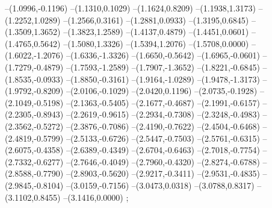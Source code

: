 {--(1.0996,-0.1196)
--(1.1310,0.1029)
--(1.1624,0.8209)
--(1.1938,1.3173)
--(1.2252,1.0289)
--(1.2566,0.3161)
--(1.2881,0.0933)
--(1.3195,0.6845)
--(1.3509,1.3652)
--(1.3823,1.2589)
--(1.4137,0.4879)
--(1.4451,0.0601)
--(1.4765,0.5642)
--(1.5080,1.3326)
--(1.5394,1.2076)
--(1.5708,0.0000)
--(1.6022,-1.2076)
--(1.6336,-1.3326)
--(1.6650,-0.5642)
--(1.6965,-0.0601)
--(1.7279,-0.4879)
--(1.7593,-1.2589)
--(1.7907,-1.3652)
--(1.8221,-0.6845)
--(1.8535,-0.0933)
--(1.8850,-0.3161)
--(1.9164,-1.0289)
--(1.9478,-1.3173)
--(1.9792,-0.8209)
--(2.0106,-0.1029)
--(2.0420,0.1196)
--(2.0735,-0.1928)
--(2.1049,-0.5198)
--(2.1363,-0.5405)
--(2.1677,-0.4687)
--(2.1991,-0.6157)
--(2.2305,-0.8943)
--(2.2619,-0.9615)
--(2.2934,-0.7308)
--(2.3248,-0.4983)
--(2.3562,-0.5272)
--(2.3876,-0.7086)
--(2.4190,-0.7622)
--(2.4504,-0.6468)
--(2.4819,-0.5799)
--(2.5133,-0.6726)
--(2.5447,-0.7503)
--(2.5761,-0.6315)
--(2.6075,-0.4358)
--(2.6389,-0.4349)
--(2.6704,-0.6463)
--(2.7018,-0.7754)
--(2.7332,-0.6277)
--(2.7646,-0.4049)
--(2.7960,-0.4320)
--(2.8274,-0.6788)
--(2.8588,-0.7790)
--(2.8903,-0.5620)
--(2.9217,-0.3411)
--(2.9531,-0.4835)
--(2.9845,-0.8104)
--(3.0159,-0.7156)
--(3.0473,0.0318)
--(3.0788,0.8317)
--(3.1102,0.8455)
--(3.1416,0.0000)
;}

